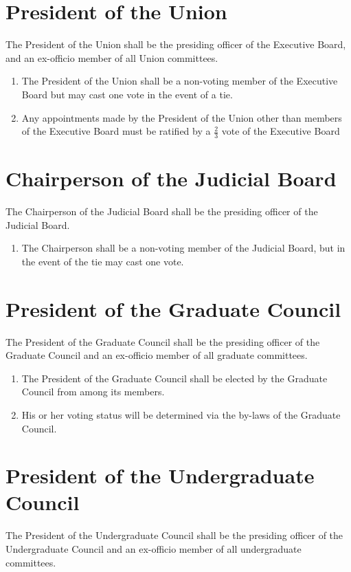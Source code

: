 \documentclass[12pt]{constitution}
\begin{document}
\section{President of the Union}
The President of the Union shall be the presiding officer of the Executive Board, and an ex-officio member of all Union committees.

\begin{enumerate}
\item The President of the Union shall be a non-voting member of the Executive Board but may cast one vote in the event of a tie.
\item Any appointments made by the President of the Union other than members of the Executive Board must be ratified by a $\frac{2}{3}$ vote of the Executive Board
\end{enumerate}

\section{Chairperson of the Judicial Board}
The Chairperson of the Judicial Board shall be the presiding officer of the Judicial Board.

\begin{enumerate}
\item The Chairperson shall be a non-voting member of the Judicial Board, but in the event of the tie may cast one vote.
\end{enumerate}

\section{President of the Graduate Council}
The President of the Graduate Council shall be the presiding officer of the Graduate Council and an ex-officio member of all graduate committees.

\begin{enumerate}
\item The President of the Graduate Council shall be elected by the Graduate Council from among its members.
\item His or her voting status will be determined via the by-laws of the Graduate Council. 
\end{enumerate}

\section{President of the Undergraduate Council}
The President of the Undergraduate Council shall be the presiding officer of the Undergraduate Council and an ex-officio member of all undergraduate committees.
\end{document}
